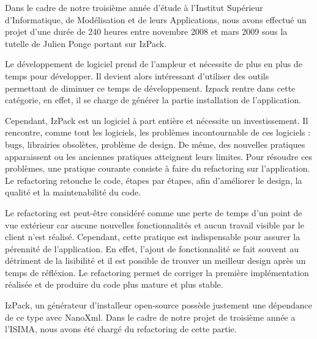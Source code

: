 Dans le cadre de notre troisième année d'étude à l'Institut Supérieur d'Informatique, de Modélisation et de leurs Applications, nous avons effectué un projet d'une durée de 240 heures entre novembre 2008 et mars 2009 sous la tutelle de Julien Ponge portant sur IzPack.

Le développement de logiciel prend de l'ampleur et nécessite de plus en plus de temps pour développer.
Il devient alors intéressant d'utiliser des outils permettant de diminuer ce temps de développement.
Izpack rentre dans cette catégorie, en effet, il se charge de générer la partie installation de l'application.

Cependant, IzPack est un logiciel à part entière et nécessite un investissement.
Il rencontre, comme tout les logiciels, les problèmes incontournable de ces logiciels : bugs, librairies obsolètes, problème de design.
De même, des nouvelles pratiques apparaissent ou les anciennes pratiques atteignent leurs limites.
Pour résoudre ces problèmes, une pratique courante consiste à faire du refactoring sur l'application.
Le refactoring retouche le code, étapes par étapes, afin d'améliorer le design, la qualité et la maintenabilité du code.

Le refactoring est peut-être considéré comme une perte de temps d'un point de vue extérieur car aucune nouvelles fonctionnalités et aucun travail visible par le client n'est réalisé.
Cependant, cette pratique est indispensable pour assurer la pérennité de l'application. 
En effet, l'ajout de fonctionnalité se fait souvent au détriment de la lisibilité et il est possible de trouver un meilleur design après un temps de réfléxion.
Le refactoring permet de corriger la première implémentation réalisée et de produire du code plus mature et plus stable.


IzPack, un générateur d'installeur open-source possède justement une dépendance de ce type avec NanoXml. Dans le cadre de notre projet de troisième année a l'ISIMA, nous avons été chargé du refactoring de cette partie.
